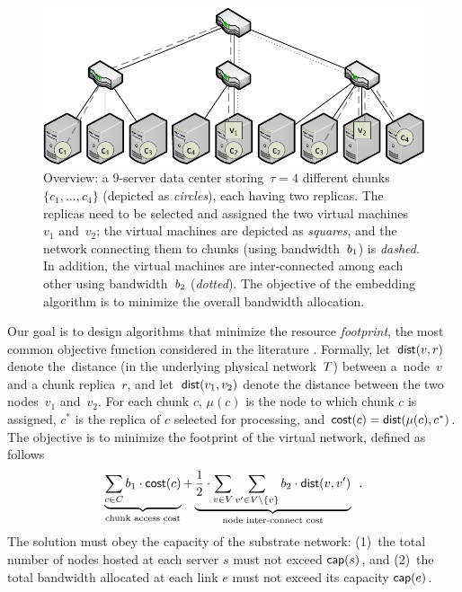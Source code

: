 \begin{figure}[t]
\centering
\includegraphics[width=0.79\columnwidth]{figs/static-mapping/data_locality_no_legend.pdf}
\caption{Overview: a 9-server data center storing~$\tau=4$ different chunks~$\{c_1,\ldots,c_4\}$ (depicted as \emph{circles}), each having two replicas. The replicas need to be selected and assigned the two
 virtual machines~$v_1$ and~$v_2$; the virtual machines are depicted as \emph{squares}, and
 the network connecting them to chunks (using bandwidth~$b_1$) is \emph{dashed}. In addition, the virtual machines are inter-connected among
 each other using bandwidth~$b_2$ (\emph{dotted}). The objective of the embedding algorithm is to minimize the overall bandwidth allocation.}\label{fig:overview}
\end{figure}


Our goal is to design algorithms that minimize the resource \emph{footprint}, the most common objective function considered in the literature \cite{fischer-survey}.
Formally, let~$\mathrm{\textsf{dist}}(v,r)$ denote the~distance (in the underlying physical network~$T$) between a~node~$v$ and
a chunk replica~$r$, and let~$\mathrm{\textsf{dist}}(v_1,v_2)$ denote the distance between the two nodes~$v_1$ and~$v_2$.
For each chunk $c$,
$\mu(c)$ is the node to which chunk $c$ is assigned,
$c^*$ is the replica of $c$ selected for processing,
and $\textsf{cost}(c) = \mathrm{\textsf{dist}}(\mu(c), c^*)$.
The objective is to minimize the footprint of the virtual network, defined as follows
$$
\underbrace{\sum_{c \in C} b_1 \cdot \textsf{cost}(c)}_{\text{chunk access cost}} +  \underbrace{\frac{1}{2} \cdot \sum_{v\in V} \sum_{v' \in V\setminus\{v\}} b_2 \cdot \mathrm{\textsf{dist}}(v,v')}_{\text{node inter-connect cost}}\enspace.
$$
The solution must obey the capacity of the substrate network: (1)~the total number of nodes hosted at each server $s$ must not exceed $\textsf{cap}(s)$, and (2)~the total bandwidth allocated at each link $e$ must not exceed its capacity $\textsf{cap}(e)$.

